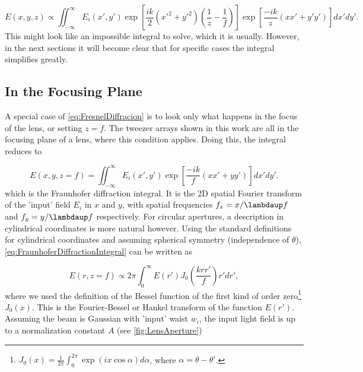 \begin{equation}\label{eq:FresnelDiffracion}
	E(x,y,z) \propto 
	\iint_{-\infty}^{\infty} E_i(x',y')
	\exp{\left[
		\frac{ik}{2}(x'^2+y'^2)\left(\frac{1}{z}-\frac{1}{f}\right)
	\right]}
	\exp{\left[\frac{-ik}{z}\left(xx'+y'y'\right)\right]} dx'dy'.
\end{equation}
This might look like an impossible integral to solve, which it is usually.
However, in the next sections it will become clear that for specific cases the integral simplifies greatly.  

\subsection{In the Focusing Plane}\label{sec:InFocus}

A special case of \cref{eq:FresnelDiffracion} is to look only what happens in the focus of the lens, or setting $z=f$.
The tweezer arrays shown in this work are all in the focusing plane of a lens, where this condition applies.
Doing this, the integral reduces to 

\begin{equation}\label{eq:FraunhoferDiffractionIntegral}
    E(x, y, z=f)=\iint_{-\infty}^{\infty} E_i(x', y') \exp \left[\frac{-ik}{f}(x x'+y y')\right] dx' dy'.
\end{equation}
which is the Fraunhofer diffraction integral. 
It is the 2D spatial Fourier transform of the 'input' field $E_i$ in $x$ and $y$, with spatial frequencies $f_x = x/\lambdaup f$ and $f_y = y/\lambdaup f$ respectively.
For circular apertures, a description in cylindrical coordinates is more natural however. 
Using the standard definitions for cylindrical coordinates and assuming spherical symmetry (independence of $\theta$), \cref{eq:FraunhoferDiffractionIntegral} can be written as 

\begin{equation}\label{eq:FourierBessel}
	E(r,z=f) \propto 2\pi \int_0^{\infty} E(r') J_0\left( \frac{k r r'}{f}\right) r'dr',
\end{equation}
where we used the definition of the  Bessel function of the first kind of order zero\footnote{$J_0(x) = \frac{1}{2\pi} \int_0^{2\pi} \exp{(i x \cos{\alpha})} d\alpha$, where  $\alpha=\theta-\theta'$.} $J_0(x)$. 
This is the Fourier-Bessel or Hankel transform of the function $E(r')$.
Assuming the beam is Gaussian with 'input' waist $w_i$, the input light field is up to a normalization constant $A$ (see \cref{fig:LensAperture})

